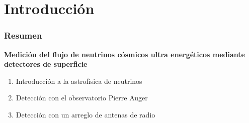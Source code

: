 \section{Introducci\'on}

\begin{frame}
 \frametitle{Resumen}
 \begin{exampleblock}{
  \begin{center}
	\textbf{Medici\'on del flujo de neutrinos c\'osmicos ultra energ\'eticos mediante detectores de superficie}
  \end{center}
  }
  \begin{enumerate}\setlength\itemsep{3mm}
   \item Introducci\'on a la astrof\'isica de neutrinos
   \item Detecci\'on con el observatorio Pierre Auger
   \item Detecci\'on con un arreglo de antenas de radio
  \end{enumerate}

 \end{exampleblock}
\end{frame}

